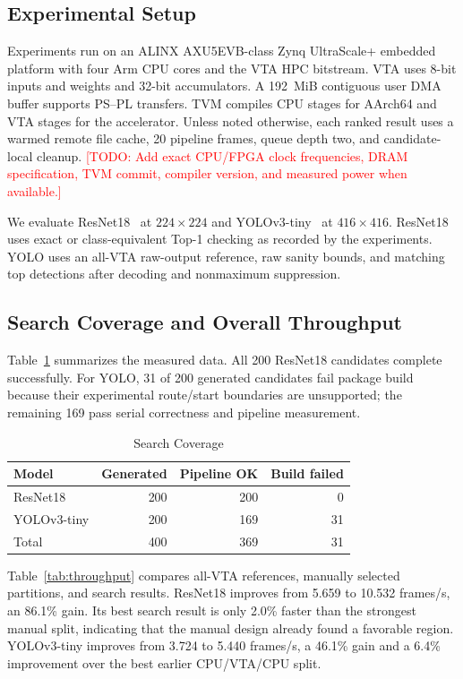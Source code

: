 \documentclass[conference]{IEEEtran}
\newcommand{\todo}[1]{\textcolor{red}{[TODO: #1]}}
\begin{document}
\subsection{Experimental Setup}

Experiments run on an ALINX AXU5EVB-class Zynq UltraScale+ embedded platform with four Arm CPU cores and the VTA HPC bitstream. VTA uses 8-bit inputs and weights and 32-bit accumulators. A 192~MiB contiguous user DMA buffer supports PS--PL transfers. TVM compiles CPU stages for AArch64 and VTA stages for the accelerator. Unless noted otherwise, each ranked result uses a warmed remote file cache, 20 pipeline frames, queue depth two, and candidate-local cleanup. \todo{Add exact CPU/FPGA clock frequencies, DRAM specification, TVM commit, compiler version, and measured power when available.}

We evaluate ResNet18~\cite{he2016resnet} at $224\times224$ and YOLOv3-tiny~\cite{redmon2018yolov3} at $416\times416$. ResNet18 uses exact or class-equivalent Top-1 checking as recorded by the experiments. YOLO uses an all-VTA raw-output reference, raw sanity bounds, and matching top detections after decoding and nonmaximum suppression.

\subsection{Search Coverage and Overall Throughput}

Table~\ref{tab:coverage} summarizes the measured data. All 200 ResNet18 candidates complete successfully. For YOLO, 31 of 200 generated candidates fail package build because their experimental route/start boundaries are unsupported; the remaining 169 pass serial correctness and pipeline measurement.

\begin{table}[t]
\caption{Search Coverage}
\label{tab:coverage}
\centering
\begin{tabular}{lrrr}
\toprule
Model & Generated & Pipeline OK & Build failed\\
\midrule
ResNet18 & 200 & 200 & 0\\
YOLOv3-tiny & 200 & 169 & 31\\
\midrule
Total & 400 & 369 & 31\\
\bottomrule
\end{tabular}
\end{table}

Table~\ref{tab:throughput} compares all-VTA references, manually selected partitions, and search results. ResNet18 improves from 5.659 to 10.532 frames/s, an 86.1\% gain. Its best search result is only 2.0\% faster than the strongest manual split, indicating that the manual design already found a favorable region. YOLOv3-tiny improves from 3.724 to 5.440 frames/s, a 46.1\% gain and a 6.4\% improvement over the best earlier CPU/VTA/CPU split.
\end{document}
